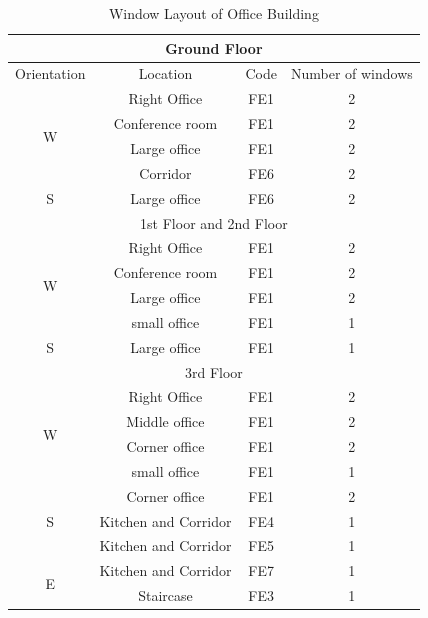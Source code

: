 \documentclass[a4paper, oneside]{discothesis}
\begin{document}
				\begin{table}[H]
				\centering
				\caption{Window Layout of Office Building}
				\begin{tabular}{  c | c | c | c  }
					\hline
					\multicolumn{4}{c}{Ground Floor}\\
					\hline
					Orientation & Location & Code & Number of windows\\ \hline
					\multirow{4}{*}{W} & Right Office & FE1 & 2 \\
					 & Conference room & FE1 & 2 \\
					 & Large office & FE1 & 2 \\
					 & Corridor & FE6 & 2 \\ \hline
					S & Large office & FE6 & 2 \\ \hline
					\multicolumn{4}{c}{1st Floor and 2nd Floor}\\\hline
					\multirow{4}{*}{W} & Right Office & FE1 & 2 \\ 
					 & Conference room & FE1 & 2 \\ 
					 & Large office & FE1 & 2 \\ 
					 & small office & FE1 & 1 \\ \hline
					S & Large office & FE1 & 1 \\ \hline
					\multicolumn{4}{c}{3rd Floor}\\ \hline
					\multirow{4}{*}{W} & Right Office & FE1 & 2 \\ 
					 & Middle office & FE1 & 2 \\ 
					 & Corner office & FE1 & 2 \\ 
					 & small office & FE1 & 1 \\ \hline
					\multirow{3}{*}{S} & Corner office & FE1 & 2 \\ 
					 & Kitchen and Corridor & FE4 & 1 \\ 
					 & Kitchen and Corridor & FE5 & 1 \\ \hline
					\multirow{2}{*}{E} & Kitchen and Corridor & FE7 & 1 \\ 
					 & Staircase & FE3 & 1 \\ \hline
				\end{tabular}
				\label{table:SumatraWindowLayout}
				\end{table}
\end{document}
